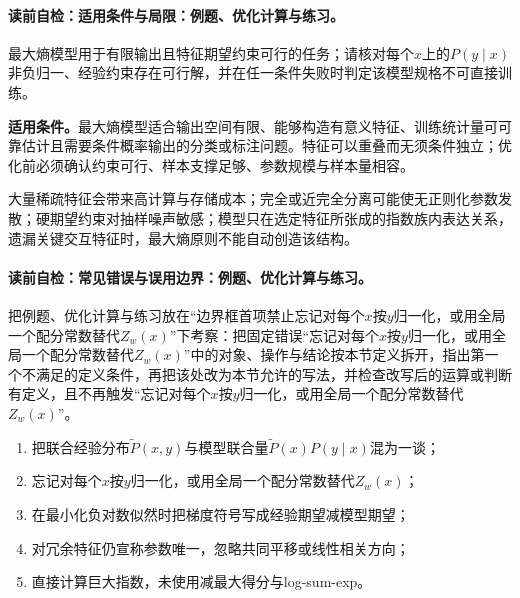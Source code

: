 \label{struct:V3-C01-CH28}
\paragraph{读前自检：适用条件与局限：例题、优化计算与练习。}最大熵模型用于有限输出且特征期望约束可行的任务；请核对每个$x$上的$P(y\mid x)$非负归一、经验约束存在可行解，并在任一条件失败时判定该模型规格不可直接训练。\par

\begin{applicabilitybox}
\textbf{适用条件。}最大熵模型适合输出空间有限、能够构造有意义特征、训练统计量可可靠估计且需要条件概率输出的分类或标注问题。特征可以重叠而无须条件独立；优化前必须确认约束可行、样本支撑足够、参数规模与样本量相容。
\end{applicabilitybox}

\label{struct:V3-C01-CH29}
\begin{notapplicablebox}[title=\SLMethodLimitationsTitle]
大量稀疏特征会带来高计算与存储成本；完全或近完全分离可能使无正则化参数发散；硬期望约束对抽样噪声敏感；模型只在选定特征所张成的指数族内表达关系，遗漏关键交互特征时，最大熵原则不能自动创造该结构。
\end{notapplicablebox}

\label{struct:V3-C01-CH30}
\paragraph{读前自检：常见错误与误用边界：例题、优化计算与练习。}把例题、优化计算与练习放在“边界框首项禁止忘记对每个$x$按$y$归一化，或用全局一个配分常数替代$Z_w(x)$”下考察：把固定错误“忘记对每个$x$按$y$归一化，或用全局一个配分常数替代$Z_w(x)$”中的对象、操作与结论按本节定义拆开，指出第一个不满足的定义条件，再把该处改为本节允许的写法，并检查改写后的运算或判断有定义，且不再触发“忘记对每个$x$按$y$归一化，或用全局一个配分常数替代$Z_w(x)$”。\par

\begin{warningbox}
\begin{enumerate}[leftmargin=2.2em]
  \item 把联合经验分布$\widetilde P(x,y)$与模型联合量$\widetilde P(x)P(y\mid x)$混为一谈；
  \item 忘记对每个$x$按$y$归一化，或用全局一个配分常数替代$Z_w(x)$；
  \item 在最小化负对数似然时把梯度符号写成经验期望减模型期望；
  \item 对冗余特征仍宣称参数唯一，忽略共同平移或线性相关方向；
  \item 直接计算巨大指数，未使用减最大得分与log-sum-exp。
\end{enumerate}
\end{warningbox}

